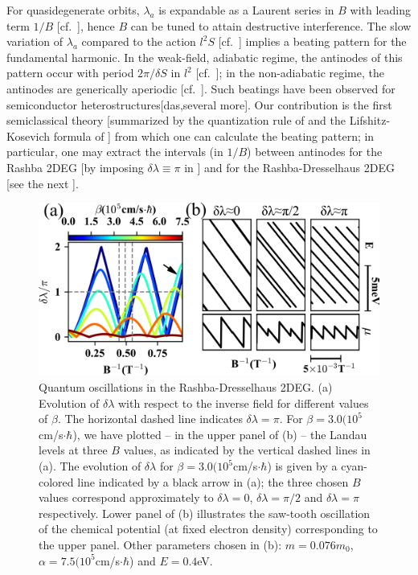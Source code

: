 \documentclass[aps, prb, showpacs, twocolumn, notitlepage, superscriptaddress]{revtex4-1}
\begin{document}
For quasidegenerate orbits,  $\lambda_a$ is expandable as a Laurent series in $B$ with leading term $1/B$ [cf.\ ], hence $B$ can be tuned to attain destructive interference. The slow variation of $\lambda_a$ compared to the action $l^2S$ [cf.\ ] implies a beating pattern for the fundamental harmonic. In the weak-field, adiabatic regime, the antinodes of this pattern occur with period $2\pi/\delta S$ in $l^2$ [cf.\ ]; in the non-adiabatic regime, the antinodes are generically aperiodic [cf.\ ]. Such beatings have been observed for semiconductor heterostructures[das,several more]. Our contribution is the first semiclassical theory  [summarized by the quantization rule of  and the Lifshitz-Kosevich formula of ] from which one can calculate the beating pattern; in particular, one may extract the intervals (in $1/B$) between antinodes  for the Rashba 2DEG [by imposing $\delta \lambda{\equiv}\pi$ in ] and for the Rashba-Dresselhaus 2DEG [see the next ]. 

\begin{figure}
\includegraphics[width=1.0\columnwidth]{qo.png}
\caption{Quantum oscillations in the Rashba-Dresselhaus 2DEG. (a) Evolution of $\delta\lambda$ with respect to the inverse field for different values of $\beta$. The horizontal dashed line indicates $\delta\lambda=\pi$. For $\beta=3.0(10^{5}$cm/s$\cdot\hbar$), we have plotted -- in the upper panel of (b) -- the Landau levels at three $B$ values, as indicated by the vertical dashed lines in (a). The evolution of $\delta \lambda$ for  $\beta=3.0(10^{5}$cm/s$\cdot\hbar$) is given by a cyan-colored line indicated by a black arrow in (a); the three chosen $B$ values correspond approximately to  $\delta\lambda{=}0$, $\delta\lambda{=}\pi/2$ and $\delta\lambda{=}\pi$ respectively. Lower panel of (b) illustrates the saw-tooth oscillation of the chemical potential (at fixed electron density) corresponding to the upper panel. Other parameters chosen in (b): $m{=}0.076m_0$, $\alpha{=}7.5(10^{5}$cm/s$\cdot\hbar$) and $E=0.4$eV.
\label{fig:qo}}
\end{figure}
\end{document}
